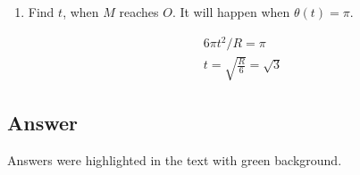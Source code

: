 \begin{enumerate}
\begin{enumerate}
\begin{answer}
                    \end{answer}
          \end{enumerate}
    \item Find $t$, when $M$ reaches $O$. It will happen when $\theta(t) = \pi$.
          \begin{answer}
              \begin{align}
                  6 \pi t^2 / R = \pi \\
                  t = \sqrt{\frac{R}{6}} = \sqrt{3}
              \end{align}
          \end{answer}
\end{enumerate}

\subsection*{Answer}

Answers were highlighted in the text with green background.